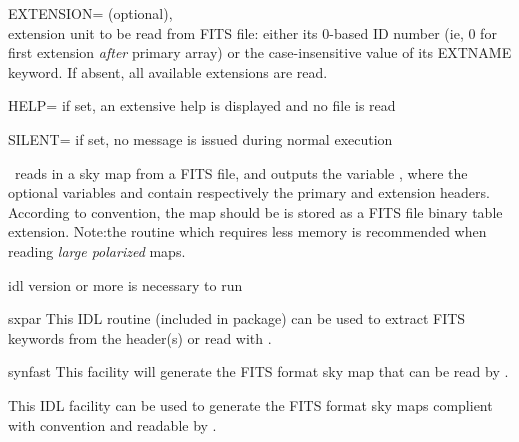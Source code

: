\begin{qualifiers}
\begin{qulist}{}
       \item[{EXTENSION=}] 
		(optional), \\
	extension unit to be read from FITS file: 
 either its 0-based ID number (ie, 0 for first extension {\em after} primary array) 
 or the case-insensitive value of its EXTNAME keyword.
	If absent, all available extensions are read.
 

  \end{qulist}
\end{qualifiers}

\begin{keywords}
  \begin{kwlist}{} %
   \item[{HELP=}]  if set, an extensive help is displayed and no
	file is read
  \item[{SILENT=}]  if set, no message is issued during normal execution
   \end{kwlist}
\end{keywords}

\begin{codedescription}
{\thedocid\ reads in a \healpix sky map from a FITS file, and outputs
the variable , where the optional variables  
and  contain
respectively the primary and extension headers. According to \healpix
convention, the map should be is stored as a FITS file binary table
extension. Note:the routine  which requires less
memory is recommended when reading {\em large polarized} maps.}
\end{codedescription}



\begin{related}
  \begin{sulist}{} %
  \item[idl] version \idlversion or more is necessary to run \thedocid

    \item[sxpar] This IDL routine (included in \healpix package) can be
  used to extract FITS keywords from the header(s)  
or  read with \thedocid.
  \item[synfast] This \healpix facility will generate the FITS format 
            sky map that can be read by \thedocid.
  \item[\htmlref{write\_fits\_map}{idl:write_fits_map}] This \healpix IDL facility can be used to generate the FITS format 
            sky maps complient with \healpix convention and readable by \thedocid.
  \end{sulist}
\end{related}


